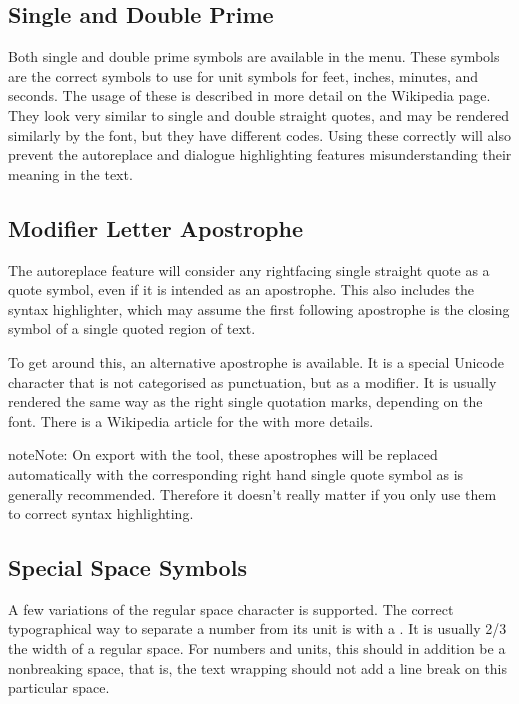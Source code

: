 \documentclass[a4paper,11pt,english]{sphinxmanual}
\begin{document}
\subsection{Single and Double Prime}
\label{\detokenize{usage_typography:single-and-double-prime}}
\sphinxAtStartPar
Both single and double prime symbols are available in the  menu. These symbols
are the correct symbols to use for unit symbols for feet, inches, minutes, and seconds. The usage
of these is described in more detail on the Wikipedia  page. They look very similar to single
and double straight quotes, and may be rendered similarly by the font, but they have different
codes. Using these correctly will also prevent the auto\sphinxhyphen{}replace and dialogue highlighting features
misunderstanding their meaning in the text.


\subsection{Modifier Letter Apostrophe}
\label{\detokenize{usage_typography:id1}}
\sphinxAtStartPar
The auto\sphinxhyphen{}replace feature will consider any right\sphinxhyphen{}facing single straight quote as a quote symbol,
even if it is intended as an apostrophe. This also includes the syntax highlighter, which may
assume the first following apostrophe is the closing symbol of a single quoted region of text.

\sphinxAtStartPar
To get around this, an alternative apostrophe is available. It is a special Unicode character that
is not categorised as punctuation, but as a modifier. It is usually rendered the same way as the
right single quotation marks, depending on the font. There is a Wikipedia article for the
 with more details.

\begin{sphinxadmonition}{note}{Note:}
\sphinxAtStartPar
On export with the  tool, these apostrophes will be replaced
automatically with the corresponding right hand single quote symbol as is generally recommended.
Therefore it doesn’t really matter if you only use them to correct syntax highlighting.
\end{sphinxadmonition}


\subsection{Special Space Symbols}
\label{\detokenize{usage_typography:special-space-symbols}}
\sphinxAtStartPar
A few variations of the regular space character is supported. The correct typographical way to
separate a number from its unit is with a . It is usually 2/3 the width of a regular
space. For numbers and units, this should in addition be a non\sphinxhyphen{}breaking space, that is, the text
wrapping should not add a line break on this particular space.
\end{document}
